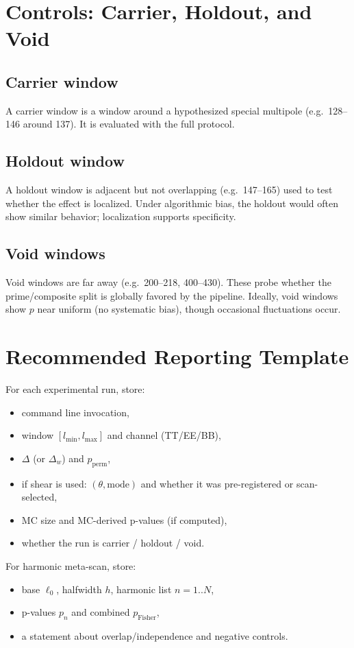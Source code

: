 \documentclass[11pt,a4paper]{article}
\begin{document}
\section{Controls: Carrier, Holdout, and Void}

\subsection{Carrier window}
A carrier window is a window around a hypothesized special multipole (e.g.\ 128--146
around 137). It is evaluated with the full protocol.

\subsection{Holdout window}
A holdout window is adjacent but not overlapping (e.g.\ 147--165) used to test whether
the effect is localized. Under algorithmic bias, the holdout would often show similar
behavior; localization supports specificity.

\subsection{Void windows}
Void windows are far away (e.g.\ 200--218, 400--430). These probe whether the
prime/composite split is globally favored by the pipeline. Ideally, void windows show
$p$ near uniform (no systematic bias), though occasional fluctuations occur.

\section{Recommended Reporting Template}

For each experimental run, store:
\begin{itemize}
\item command line invocation,
\item window $[l_{\min},l_{\max}]$ and channel (TT/EE/BB),
\item $\Delta$ (or $\Delta_w$) and $p_{\mathrm{perm}}$,
\item if shear is used: $(\theta, \text{mode})$ and whether it was pre-registered or scan-selected,
\item MC size and MC-derived p-values (if computed),
\item whether the run is carrier / holdout / void.
\end{itemize}

For harmonic meta-scan, store:
\begin{itemize}
\item base $\ell_0$, halfwidth $h$, harmonic list $n=1..N$,
\item p-values $p_n$ and combined $p_{\mathrm{Fisher}}$,
\item a statement about overlap/independence and negative controls.
\end{itemize}
\end{document}
